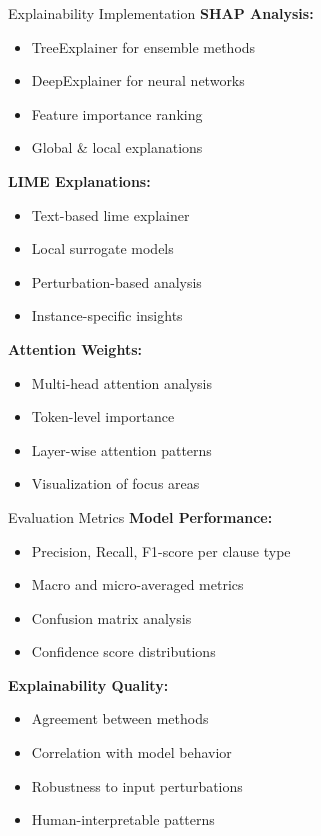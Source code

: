 \begin{frame}{Explainability Implementation}
\textbf{SHAP Analysis:}
\begin{itemize}
    \item TreeExplainer for ensemble methods
    \item DeepExplainer for neural networks
    \item Feature importance ranking
    \item Global \& local explanations
\end{itemize}

\vspace{0.3cm}
\textbf{LIME Explanations:}
\begin{itemize}
    \item Text-based lime explainer
    \item Local surrogate models  
    \item Perturbation-based analysis
    \item Instance-specific insights
\end{itemize}

\vspace{0.3cm}
\textbf{Attention Weights:}
\begin{itemize}
    \item Multi-head attention analysis
    \item Token-level importance
    \item Layer-wise attention patterns
    \item Visualization of focus areas
\end{itemize}
\end{frame}

\begin{frame}{Evaluation Metrics}
\textbf{Model Performance:}
\begin{itemize}
    \item Precision, Recall, F1-score per clause type
    \item Macro and micro-averaged metrics
    \item Confusion matrix analysis
    \item Confidence score distributions
\end{itemize}

\vspace{0.5cm}
\textbf{Explainability Quality:}
\begin{itemize}
    \item {} Agreement between methods
    \item {} Correlation with model behavior
    \item {} Robustness to input perturbations
    \item {} Human-interpretable patterns
\end{itemize}
\end{frame}
